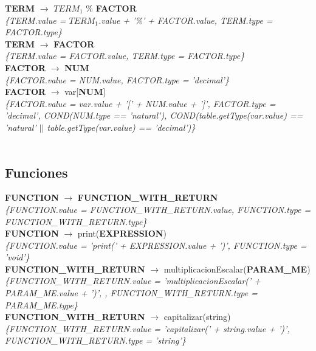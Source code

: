 \documentclass[10pt,a4paper]{article}
\begin{document}
\textbf{TERM} $\rightarrow$ \textbf{$TERM_{1}$} \% \textbf{FACTOR}  \\
\textit{\{TERM.value = $TERM_{1}$.value + '\%' + FACTOR.value, TERM.type = FACTOR.type\}} \\

\textbf{TERM} $\rightarrow$ \textbf{FACTOR} \\
\textit{\{TERM.value = FACTOR.value, TERM.type = FACTOR.type\}} \\

\textbf{FACTOR} $\rightarrow$ \textbf{NUM}   \\
\textit{\{FACTOR.value = NUM.value, FACTOR.type = 'decimal'\}} \\

\textbf{FACTOR} $\rightarrow$ var[\textbf{NUM}]  \\ 
\textit{\{FACTOR.value = var.value + '[' + NUM.value + ']', FACTOR.type = 'decimal', COND(NUM.type == 'natural'), COND(table.getType(var.value) == 'natural' $||$ table.getType(var.value) == 'decimal')\}}  \\ 
\\

\subsection{Funciones}
\textbf{FUNCTION} $\rightarrow$ \textbf{FUNCTION\_WITH\_RETURN} \\
\textit{\{FUNCTION.value =  FUNCTION\_WITH\_RETURN.value, FUNCTION.type = FUNCTION\_WITH\_RETURN.type\}} \\

\textbf{FUNCTION} $\rightarrow$ print(\textbf{EXPRESSION}) \\   
\textit{\{FUNCTION.value =  'print(' + EXPRESSION.value + ')', FUNCTION.type = 'void'\}} \\

\textbf{FUNCTION\_WITH\_RETURN} $\rightarrow$ multiplicacionEscalar(\textbf{PARAM\_ME}) \\ 
\textit{\{FUNCTION\_WITH\_RETURN.value =  'multiplicacionEscalar(' + PARAM\_ME.value + ')', , FUNCTION\_WITH\_RETURN.type = PARAM\_ME.type\}} \\

\textbf{FUNCTION\_WITH\_RETURN} $\rightarrow$ capitalizar(string)   \\
\textit{\{FUNCTION\_WITH\_RETURN.value =  'capitalizar(' + string.value + ')', FUNCTION\_WITH\_RETURN.type = 'string'\}} \\
\end{document}
